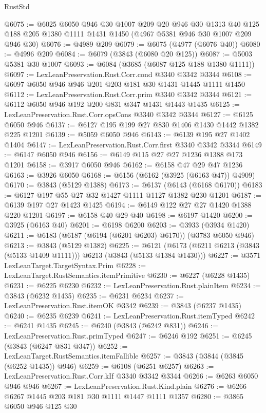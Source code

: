 \begin{lexlean}{RustStd}
\begin{coremodule}
@6075 := @6025
    @6050
    @946
    @30
    @1007
    @209
    @20
    @946
    @30
    @1313
    @40
    @125
    @188
    @205
    @1380
    @1111
    @1431
    @1450
    (@4967 @5381 @946 @30 @1007 @209 @946 @30)
@6076 := @4989 @209
@6079 := @6075 (@4977 (@6076 @40))
@6080 := @4996 @209
@6084 := @6079 (@3843 (@6080 @20 @125))
@6087 := @5003 @5381 @30 @1007
@6093 := @6084 (@3685 (@6087 @125 @188 @1380 @1111))
@6097 := LexLeanPreservation.Rust.Corr.cond @3340 @3342 @3344
@6108 := @6097 @6050 @946 @946 @201 @203 @181 @30 @1431 @1445 @1111 @1450
@6112 := LexLeanPreservation.Rust.Corr.prim @3340 @3342 @3344
@6121 := @6112 @6050 @946 @192 @200 @831 @347 @1431 @1443 @1435
@6125 := LexLeanPreservation.Rust.Corr.opsCons @3340 @3342 @3344
@6127 := @6125 @6050 @946
@6137 := @6127 @195 @199 @27 @830 @1406 @1430 @1442 @1382 @225 @1201
@6139 := @5059 @6050 @946
@6143 := @6139 @195 @27 @1402 @1404
@6147 := LexLeanPreservation.Rust.Corr.first @3340 @3342 @3344
@6149 := @6147 @6050 @946
@6156 := @6149 @115 @27 @27 @1236 @1388 @173 @1201
@6158 := @3917 @6050 @946
@6162 := @6158 @47 @29 @47 @1236
@6163 := @3926 @6050
@6168 := @6156 (@6162 (@3925 (@6163 @47)) @4909)
@6170 := @3843 (@5129 @1388)
@6173 := @6137 (@6143 (@6168 @6170))
@6183 := @6127 @197 @55 @27 @32 @1427 @1111 @1127 @1382 @230 @1201
@6187 := @6139 @197 @27 @1423 @1425
@6194 := @6149 @122 @27 @27 @1420 @1388 @220 @1201
@6197 := @6158 @40 @29 @40
@6198 := @6197 @1420
@6200 := @3925 (@6163 @40)
@6201 := @6198 @6200
@6203 := @3933 (@3934 @1420)
@6211 := @6183 (@6187 (@6194 (@6201 @6203) @6170)) (@3783 @6050 @946)
@6213 := @3843 (@5129 @1382)
@6225 := @6121 (@6173 (@6211 @6213 (@3843 (@5133 @1409 @1111))) @6213 (@3843 (@5133 @1384 @1430)))
@6227 := @3571 LexLeanTarget.TargetSyntax.Prim
@6228 := LexLeanTarget.RustSemantics.itemPrimitive
@6230 := @6227 (@6228 @1435)
@6231 := @6225 @6230
@6232 := LexLeanPreservation.Rust.plainItem
@6234 := @3843 (@6232 @1435)
@6235 := @6231 @6234
@6237 := LexLeanPreservation.Rust.itemOK @3342
@6239 := @3843 (@6237 @1435)
@6240 := @6235 @6239
@6241 := LexLeanPreservation.Rust.itemTyped
@6242 := @6241 @1435
@6245 := @6240 (@3843 (@6242 @831))
@6246 := LexLeanPreservation.Rust.primTyped
@6247 := @6246 @192
@6251 := @6245 (@3843 (@6247 @831 @347))
@6252 := LexLeanTarget.RustSemantics.itemFallible
@6257 := @3843 (@3844 (@3845 (@6252 @1435)) @946)
@6259 := @6108 (@6251 @6257)
@6263 := LexLeanPreservation.Rust.Corr.kIf @3340 @3342 @3344
@6266 := @6263 @6050 @946 @946
@6267 := LexLeanPreservation.Rust.Kind.plain
@6276 := @6266 @6267 @1445 @203 @181 @30 @1111 @1447 @1111 @1357
@6280 := @3865 @6050 @946 @125 @30

\end{coremodule}
\end{lexlean}
